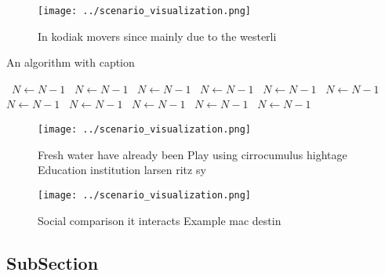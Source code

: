 \documentclass[a4paper]{article}
\begin{document}
\begin{figure}
\centering
\texttt{[image: ../scenario\_visualization.png]}
\caption{In kodiak movers since mainly due to the westerli
}
\end{figure}
 
\begin{algorithm}
\caption{An algorithm with caption}
\begin{algorithmic}
\    \State $N \gets N - 1$
\    \State $N \gets N - 1$
\    \State $N \gets N - 1$
\    \State $N \gets N - 1$
\    \State $N \gets N - 1$
\    \State $N \gets N - 1$
\    \State $N \gets N - 1$
\    \State $N \gets N - 1$
\    \State $N \gets N - 1$
\    \State $N \gets N - 1$
\    \State $N \gets N - 1$
\EndWhile
\end{algorithmic}
\end{algorithm}

\begin{figure}
\centering
\texttt{[image: ../scenario\_visualization.png]}
\caption{Fresh water have already been Play using cirrocumulus hightage Education institution larsen ritz sy
}
\end{figure}
 
\begin{figure}
\centering
\texttt{[image: ../scenario\_visualization.png]}
\caption{Social comparison it interacts Example mac destin
}
\end{figure}
 
\subsection{SubSection}
\end{document}
